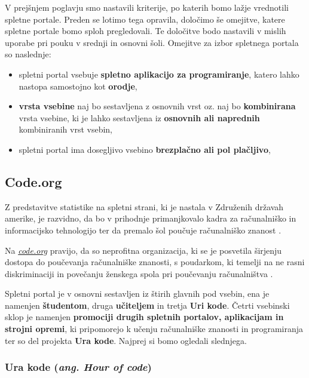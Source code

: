 V prejšnjem poglavju smo nastavili kriterije, po katerih bomo lažje
vrednotili spletne portale. Preden se lotimo tega opravila, določimo
še omejitve, katere spletne portale bomo sploh pregledovali. Te
določitve bodo nastavili v mislih uporabe pri pouku v srednji in
osnovni šoli. Omejitve za izbor spletnega portala so naslednje:

\begin{itemize}
  \tightlist
\item spletni portal vsebuje \textbf{spletno aplikacijo za
    programiranje}, katero lahko nastopa samostojno kot
  \textbf{orodje},
\item \textbf{vrsta vsebine} naj bo sestavljena z osnovnih vrst
  oz. naj bo \textbf{kombinirana} vrsta vsebine, ki je lahko
  sestavljena iz \textbf{osnovnih ali naprednih} kombiniranih vrst vsebin,
\item spletni portal ima dosegljivo vsebino \textbf{brezplačno ali pol
  plačljivo},
\end{itemize}

\subsection{Code.org}
\label{sec:Code.org}

Z predstavitve statistike na spletni strani, ki je nastala v Združenih
državah amerike, je razvidno, da bo v prihodnje primanjkovalo kadra za
računalniško in informacijsko tehnologijo ter da premalo šol poučuje
računalniško znanost \cite{web:code.org:promote}.

Na \emph{\href{https://code.org}{code.org}} \cite{web:code.org}
pravijo, da so neprofitna organizacija, ki se je posvetila širjenju
dostopa do poučevanja računalniške znanosti, s poudarkom, ki temelji
na ne rasni diskriminaciji in povečanju ženskega spola pri poučevanju
računalništva \cite{web:code.org:about}.

Spletni portal je v osnovni sestavljen iz štirih glavnih pod vsebin,
ena je namenjen \textbf{študentom}, druga \textbf{učiteljem} in tretja
\textbf{Uri kode}. Četrti vsebinski sklop je namenjen
\textbf{promociji drugih spletnih portalov, aplikacijam in strojni
  opremi}, ki pripomorejo k učenju računalniške znanosti in
programiranja ter so del projekta \textbf{Ura kode}. Najprej si bomo
ogledali slednjega.

\subsubsection{Ura kode (\emph{ang. Hour of code})}
\label{sec:ura-kode-ang}

